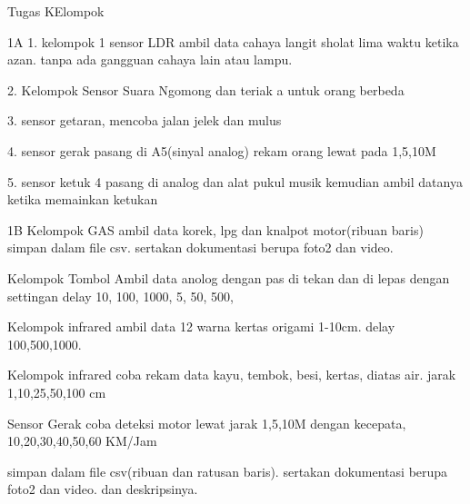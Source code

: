 Tugas KElompok

1A
1. kelompok 1 sensor LDR
ambil data cahaya langit sholat lima waktu ketika azan. tanpa ada gangguan cahaya lain atau lampu.

2. Kelompok Sensor Suara
Ngomong dan teriak a untuk orang berbeda

3. sensor getaran, mencoba jalan jelek dan mulus

4. sensor gerak
pasang di A5(sinyal analog) rekam orang lewat pada 1,5,10M


5. sensor ketuk 4
pasang di analog dan alat pukul musik kemudian ambil datanya ketika memainkan ketukan



1B
Kelompok GAS
ambil data korek, lpg dan knalpot motor(ribuan baris) simpan dalam file csv. sertakan dokumentasi berupa foto2 dan video.

Kelompok Tombol
Ambil data anolog dengan pas di tekan dan di lepas dengan settingan delay 10, 100, 1000, 5, 50, 500,

Kelompok infrared
ambil data 12 warna kertas origami 1-10cm. delay 100,500,1000.

Kelompok infrared
coba rekam data kayu, tembok, besi, kertas, diatas air. jarak 1,10,25,50,100 cm 

Sensor Gerak
coba deteksi motor lewat jarak 1,5,10M dengan kecepata, 10,20,30,40,50,60 KM/Jam


simpan dalam file csv(ribuan dan ratusan baris). sertakan dokumentasi berupa foto2 dan video. dan deskripsinya.